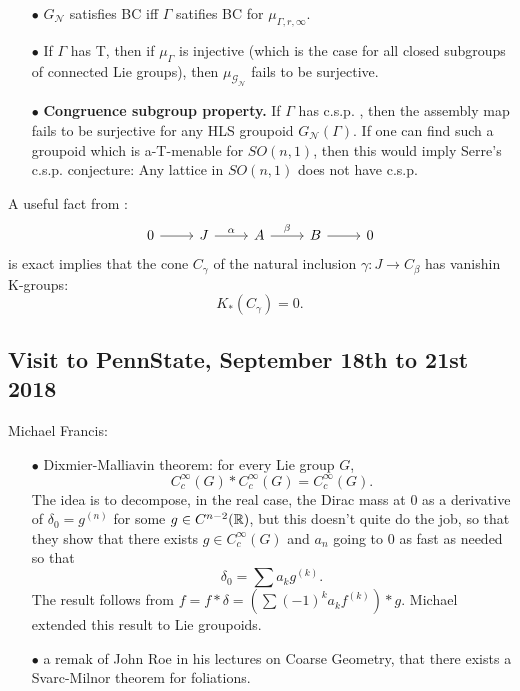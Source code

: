 \begin{itemize}
\item[$\bullet$] $G_{\mathcal N}$ satisfies BC iff $\Gamma$ satifies BC for $\mu_{\Gamma,r,\infty}$.\\

\item[$\bullet$] If $\Gamma$ has T, then if $\mu_\Gamma$ is injective (which is the case for all closed subgroups of connected Lie groups), then $\mu_{\mathcal G_{\mathcal N}}$ fails to be surjective.\\

\item[$\bullet$] \textbf{Congruence subgroup property.} If $\Gamma$ has c.s.p. , then the assembly map fails to be surjective for any HLS groupoid $G_{\mathcal N}(\Gamma)$. If one can find such a groupoid which is a-T-menable for $SO(n,1)$, then this would imply Serre's c.s.p. conjecture: Any lattice in $SO(n,1)$ does not have c.s.p.\\
\end{itemize}

A useful fact from \cite{HLS}: 
\[\begin{tikzcd}0 \arrow{r} & J \arrow{r}{\alpha} & A \arrow{r}{\beta} &  B \arrow{r} & 0 \end{tikzcd}\]
is exact implies that the cone $C_\gamma$ of the natural inclusion $\gamma : J \rightarrow C_\beta$ has vanishin K-groups: \[K_*(C_\gamma) = 0.\]

\subsection{Visit to PennState, September 18th to 21st 2018}

Michael Francis:

\begin{itemize}
\item[$\bullet$] Dixmier-Malliavin theorem: for every Lie group $G$,
\[ C_c^\infty(G) \ast C_c^\infty(G) = C_c^\infty(G). \]
The idea is to decompose, in the real case, the Dirac mass at $0$ as a derivative of $\delta_0 =g^{(n)}$ for some $g\in C^{n-2}(\mathbb R)$, but this doesn't quite do the job, so that they show that there exists $g\in C_c^\infty(G)$ and $a_n$ going to $0$ as fast as needed so that 
\[\delta_ 0 = \sum a_k g^{(k)}.\]
The result follows from $f=f\ast \delta = (\sum (-1)^k a_k f^{(k)}) \ast g$. Michael extended this result to Lie groupoids.\\
\item[$\bullet$] a remak of John Roe in his lectures on Coarse Geometry, that there exists a Svarc-Milnor theorem for foliations.\\
\end{itemize}

